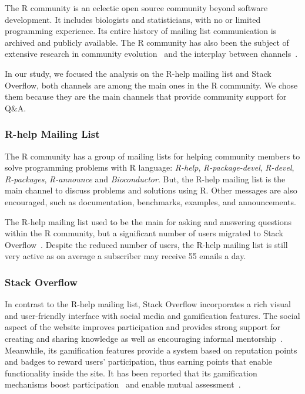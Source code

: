    The R community is an eclectic open source community beyond software development.
    It includes biologists and statisticians, with no or limited programming experience.
    Its entire history of mailing list communication is archived and publicly available.
    The R community has also been the subject of extensive research in community evolution~\cite{German2013,Vasi1escu2014PhD} and the interplay between channels~\cite{Vasilescu2014c}.

    In our study, we focused the analysis on the R-help mailing list and Stack Overflow, both channels are among the main ones in the R community.
    We chose them because they are the main channels that provide community support for Q\&A.

\subsubsection{R-help Mailing List}
    The R community has a group of mailing lists for helping community members to solve programming problems with R language: \emph{R-help}, \emph{R-package-devel}, \emph{R-devel}, \emph{R-packages}, \emph{R-announce} and \emph{Bioconductor}. But, the R-help mailing list is the main channel to discuss problems and solutions using R.  Other messages are also encouraged, such as documentation, benchmarks, examples, and announcements.

    The R-help mailing list used to be the main \channel for asking and answering questions within the R community, but a significant number of users migrated to Stack Overflow~\cite{Vasilescu2014c}.
    Despite the reduced number of users, the R-help mailing list is still very active as on average a subscriber may receive 55 emails a day.

\subsubsection{Stack Overflow}
\label{subsec:Rtag}

    In contrast to the R-help mailing list, Stack Overflow incorporates a rich visual and user-friendly interface with social media and gamification features.
    The social aspect of the website improves participation and provides strong support for creating and sharing knowledge as well as encouraging informal mentorship~\cite{Jenkins2009, Storey2014}.
    Meanwhile, its gamification features provide a system based on reputation points and badges to reward users' participation, thus earning points that enable functionality inside the site.
    It has been reported that its gamification mechanisms boost participation~\cite{Vasilescu2014} and enable mutual assessment~\cite{Singer2013}.


